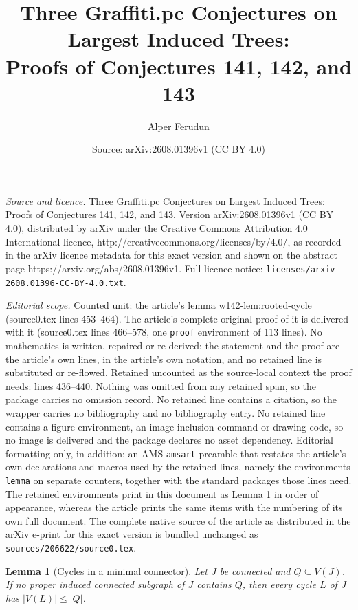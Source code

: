 \documentclass[10pt,a4paper]{amsart}
\title{Three Graffiti.pc Conjectures on Largest Induced Trees:\\ Proofs of Conjectures 141, 142, and 143}
\author{Alper Ferudun}
\date{Source: arXiv:2608.01396v1 (CC BY 4.0)}
\newtheorem{lemma}{Lemma}
\begin{document}
\maketitle

\noindent\emph{Source and licence.} Three Graffiti.pc Conjectures on Largest Induced Trees:\\ Proofs of Conjectures 141, 142, and 143. Version arXiv:2608.01396v1 (CC BY 4.0), distributed by arXiv under the Creative Commons Attribution 4.0 International licence, http://creativecommons.org/licenses/by/4.0/, as recorded in the arXiv licence metadata for this exact version and shown on the abstract page https://arxiv.org/abs/2608.01396v1. Full licence notice: \texttt{licenses/arxiv-2608.01396-CC-BY-4.0.txt}.\par\smallskip

\noindent\textit{Editorial scope.} Counted unit: the article's lemma w142-lem:rooted-cycle (source0.tex lines 453--464). The article's complete original proof of it is delivered with it (source0.tex lines 466--578, one \texttt{proof} environment of 113 lines). No mathematics is written, repaired or re-derived: the statement and the proof are the article's own lines, in the article's own notation, and no retained line is substituted or re-flowed.  Retained uncounted as the source-local context the proof needs: lines 436--440.  Nothing was omitted from any retained span, so the package carries no omission record.  No retained line contains a citation, so the wrapper carries no bibliography and no bibliography entry.  No retained line contains a figure environment, an image-inclusion command or drawing code, so no image is delivered and the package declares no asset dependency.  Editorial formatting only, in addition: an AMS \texttt{amsart} preamble that restates the article's own declarations and macros used by the retained lines, namely the environments \texttt{lemma} on separate counters, together with the standard packages those lines need.  The retained environments print in this document as Lemma 1 in order of appearance, whereas the article prints the same items with the numbering of its own full document.  The complete native source of the article as distributed in the arXiv e-print for this exact version is bundled unchanged as \texttt{sources/206622/source0.tex}.
\begin{lemma}[Cycles in a minimal connector]\label{w142-lem:minimal-connector}
Let $J$ be connected and $Q\subseteq V(J)$.  If no proper induced connected
subgraph of $J$ contains $Q$, then every cycle $L$ of $J$ has
$|V(L)|\le |Q|$.
\end{lemma}
\end{document}
